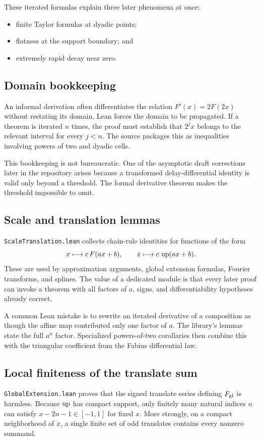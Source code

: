 \documentclass[11pt,oneside]{article}
\theoremstyle{definition}
\theoremstyle{remark}
\begin{document}
These iterated formulas explain three later phenomena at once:
\begin{itemize}
  \item finite Taylor formulas at dyadic points;
  \item flatness at the support boundary; and
  \item extremely rapid decay near zero.
\end{itemize}

\subsection{Domain bookkeeping}
An informal derivation often differentiates the relation \(F'(x)=2F(2x)\) without restating its domain.  Lean forces the domain to be propagated.  If a theorem is iterated \(n\) times, the proof must establish that \(2^j x\) belongs to the relevant interval for every \(j<n\).  The source packages this as inequalities involving powers of two and dyadic cells.

This bookkeeping is not bureaucratic.  One of the asymptotic draft corrections later in the repository arises because a transformed delay-differential identity is valid only beyond a threshold.  The formal derivative theorem makes the threshold impossible to omit.

\subsection{Scale and translation lemmas}
\nolinkurl{ScaleTranslation.lean} collects chain-rule identities for functions of the form
\[
  x\longmapsto c\,F(ax+b),
  \qquad
  x\longmapsto c\,\operatorname{up}(ax+b).
\]
These are used by approximation arguments, global extension formulas, Fourier transforms, and splines.  The value of a dedicated module is that every later proof can invoke a theorem with all factors of \(a\), signs, and differentiability hypotheses already correct.

A common Lean mistake is to rewrite an iterated derivative of a composition as though the affine map contributed only one factor of \(a\).  The library's lemmas state the full \(a^n\) factor.  Specialized powers-of-two corollaries then combine this with the triangular coefficient from the Fabius differential law.

\subsection{Local finiteness of the translate sum}
\nolinkurl{GlobalExtension.lean} proves that the signed translate series defining \(F_{\mathrm{gl}}\) is harmless.  Because \(\operatorname{up}\) has compact support, only finitely many natural indices \(n\) can satisfy \(x-2n-1\in[-1,1]\) for fixed \(x\).  More strongly, on a compact neighborhood of \(x\), a single finite set of odd translates contains every nonzero summand.
\end{document}
